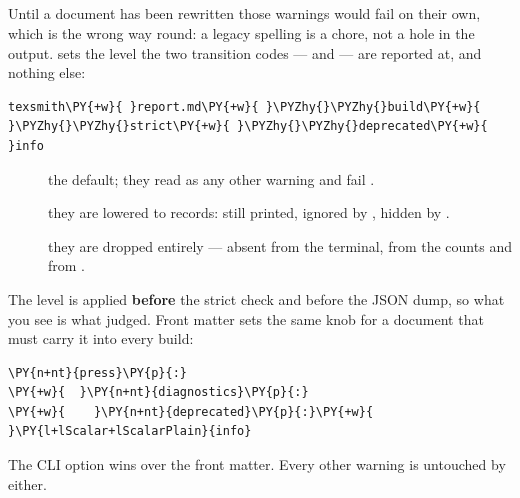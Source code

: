 \documentclass[a4paper,twoside]{article}
\begin{document}
\subsection{}
Until a document has been rewritten those warnings would fail  on
their own, which is the wrong way round: a legacy spelling is a chore, not a
hole in the output.  sets the level the two transition codes ---
 and  --- are reported at, and nothing
else:
\begin{tscode}[lang=sh, engine=pygments]
\begin{Verbatim}[commandchars=\\\{\},breaklines, breakanywhere, commandchars=\\\{\}]
texsmith\PY{+w}{ }report.md\PY{+w}{ }\PYZhy{}\PYZhy{}build\PY{+w}{ }\PYZhy{}\PYZhy{}strict\PY{+w}{ }\PYZhy{}\PYZhy{}deprecated\PY{+w}{ }info
\end{Verbatim}
\end{tscode}
\begin{description}
\item[{}] the default; they read as any other warning and fail .
\item[{}] they are lowered to  records: still printed, ignored by ,
hidden by .
\item[{}] they are dropped entirely --- absent from the terminal, from the counts and
from .
\end{description}
The level is applied \textbf{before} the strict check and before the JSON dump, so
what you see is what  judged. Front matter sets the same knob for a
document that must carry it into every build:
\begin{tscode}[lang=yaml, engine=pygments]
\begin{Verbatim}[commandchars=\\\{\},breaklines, breakanywhere, commandchars=\\\{\}]
\PY{n+nt}{press}\PY{p}{:}
\PY{+w}{  }\PY{n+nt}{diagnostics}\PY{p}{:}
\PY{+w}{    }\PY{n+nt}{deprecated}\PY{p}{:}\PY{+w}{ }\PY{l+lScalar+lScalarPlain}{info}
\end{Verbatim}
\end{tscode}
The CLI option wins over the front matter. Every other warning is untouched by
either.
\end{document}

